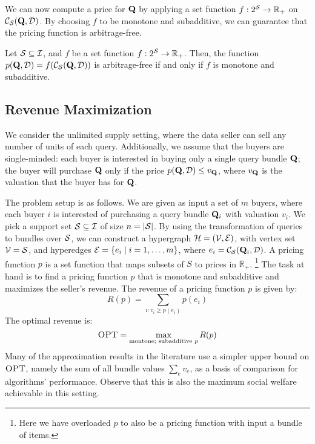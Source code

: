 We can now compute a price for $\mathbf{Q}$ by applying a set function $f: 2^{\mathcal{S}} \rightarrow  \mathbb{R}_+$ on ${\mathcal{C}}_{\mathcal{S}}(\mathbf{Q}, \mathcal{D})$. 
By choosing $f$ to be monotone and subadditive, we can guarantee that the pricing function is arbitrage-free.

\begin{theorem} \label{cor:arbitrage}
Let $\mathcal{S} \subseteq \mathcal{I}$, and $f$ be a set function $f: 2^{\mathcal{S}} \rightarrow  \mathbb{R}_+$. Then, the function $p(\mathbf{Q}, \mathcal{D}) = f({\mathcal{C}}_{\mathcal{S}}(\mathbf{Q}, \mathcal{D}))$ is arbitrage-free
if and only if  $f$ is monotone and subadditive. 
\end{theorem}

\subsection{Revenue Maximization}

We consider the unlimited supply setting, where the data seller can sell any number of units of each query. 
Additionally, we assume that the buyers are single-minded: each buyer is interested in buying only a single query bundle $\mathbf{Q}$; the buyer will purchase $\mathbf{Q}$ only if the price $p(\mathbf{Q}, \mathcal{D}) \leq v_{\mathbf{Q}}$, where $v_{\mathbf{Q}}$ is the valuation  that the buyer has for $\mathbf{Q}$. 

The problem setup is as follows. We are given as input a set of $m$ buyers, where each buyer $i$ is interested of purchasing a query bundle $\mathbf{Q}_i$ with valuation $v_i$. We pick a support set $\mathcal{S} \subseteq \mathcal{I}$ of size $n = |\mathcal{S}|$. By using the transformation of queries to bundles over $\mathcal{S}$, we can construct a hypergraph $\mathcal{H} = (\mathcal{V},\mathcal{E})$, with vertex set $\mathcal{V} = \mathcal{S}$, and hyperedges $\mathcal{E} = \{{e_i}\mid{i =1, \dots, m}\}$, where $e_i ={\mathcal{C}}_{\mathcal{S}}(\mathbf{Q}_i, \mathcal{D})$. A pricing function $p$ is a set function that maps subsets of $S$ to prices in $\mathbb{R}_+$. \footnote{Here we have overloaded $p$ to also be a pricing function with input a bundle of items.} The task at hand is to find a pricing function $p$ that is monotone and subadditive and maximizes the seller's revenue. The revenue of a pricing function $p$ is given by:
\[R(p) = \sum_{i: v_i\ge p(e_i)} p(e_i)\]
The optimal revenue is:
\[\textsc{OPT} = \max_{\text{montone; subadditive } p} R(p)\]
Many of the approximation results in the literature use a simpler upper bound on $\textsc{OPT}$, namely the sum of all bundle values $\sum_e v_e$, as a basis of comparison for algorithms' performance. Observe that this is also the maximum social welfare achievable in this setting.

